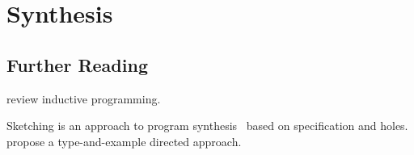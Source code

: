 \chapter{Synthesis}

\section{Further Reading}

\cite{synthesis-review} review inductive programming.

Sketching is an approach to program synthesis~\citep{sketching} based
on specification and holes. \cite{osera} propose a type-and-example
directed approach.

